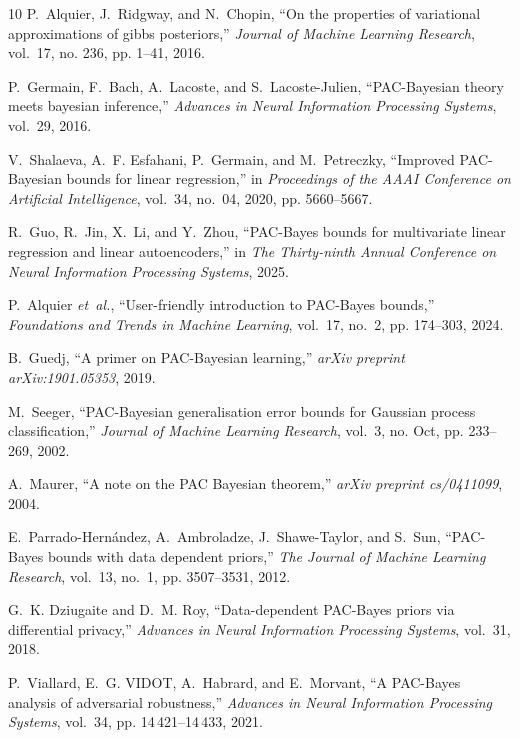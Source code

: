 \documentclass[journal]{IEEEtran} %
\begin{document}
\begin{thebibliography}{10}
P.~Alquier, J.~Ridgway, and N.~Chopin, ``On the properties of variational
  approximations of gibbs posteriors,'' \emph{Journal of Machine Learning
  Research}, vol.~17, no. 236, pp. 1--41, 2016.

P.~Germain, F.~Bach, A.~Lacoste, and S.~Lacoste-Julien, ``{PAC-Bayesian} theory
  meets bayesian inference,'' \emph{Advances in Neural Information Processing
  Systems}, vol.~29, 2016.

V.~Shalaeva, A.~F. Esfahani, P.~Germain, and M.~Petreczky, ``Improved
  {PAC-Bayesian} bounds for linear regression,'' in \emph{Proceedings of the
  AAAI Conference on Artificial Intelligence}, vol.~34, no.~04, 2020, pp.
  5660--5667.

R.~Guo, R.~Jin, X.~Li, and Y.~Zhou, ``{PAC-Bayes} bounds for multivariate
  linear regression and linear autoencoders,'' in \emph{The Thirty-ninth Annual
  Conference on Neural Information Processing Systems}, 2025.

P.~Alquier \emph{et~al.}, ``User-friendly introduction to {PAC-Bayes} bounds,''
  \emph{Foundations and Trends{\textregistered} in Machine Learning}, vol.~17,
  no.~2, pp. 174--303, 2024.

B.~Guedj, ``A primer on {PAC-Bayesian} learning,'' \emph{arXiv preprint
  arXiv:1901.05353}, 2019.

M.~Seeger, ``{PAC-Bayesian} generalisation error bounds for {G}aussian process
  classification,'' \emph{Journal of Machine Learning Research}, vol.~3, no.
  Oct, pp. 233--269, 2002.

A.~Maurer, ``A note on the {PAC Bayesian} theorem,'' \emph{arXiv preprint
  cs/0411099}, 2004.

E.~Parrado-Hern{\'a}ndez, A.~Ambroladze, J.~Shawe-Taylor, and S.~Sun,
  ``{PAC-Bayes} bounds with data dependent priors,'' \emph{The Journal of
  Machine Learning Research}, vol.~13, no.~1, pp. 3507--3531, 2012.

G.~K. Dziugaite and D.~M. Roy, ``Data-dependent {PAC-Bayes} priors via
  differential privacy,'' \emph{Advances in Neural Information Processing
  Systems}, vol.~31, 2018.

P.~Viallard, E.~G. VIDOT, A.~Habrard, and E.~Morvant, ``A {PAC-Bayes} analysis
  of adversarial robustness,'' \emph{Advances in Neural Information Processing
  Systems}, vol.~34, pp. 14\,421--14\,433, 2021.


\end{thebibliography}
\end{document}
